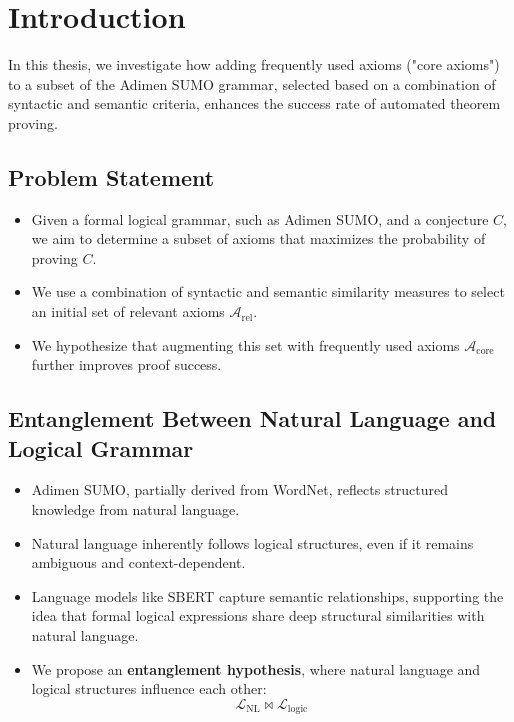 \documentclass[english,version-2020-11]{uzl-thesis}
\begin{document}
%
%


\chapter{Introduction}

  In this thesis, we investigate how adding frequently used axioms ("core axioms") to a subset of the Adimen SUMO grammar, selected based on a combination of syntactic and semantic criteria, enhances the success rate of automated theorem proving.

  \section{Problem Statement}
    \begin{itemize}
        \item Given a formal logical grammar, such as Adimen SUMO, and a conjecture $C$, we aim to determine a subset of axioms that maximizes the probability of proving $C$.
        \item We use a combination of syntactic and semantic similarity measures to select an initial set of relevant axioms $\mathcal{A}_{\text{rel}}$.
        \item We hypothesize that augmenting this set with frequently used axioms $\mathcal{A}_{\text{core}}$ further improves proof success.
    \end{itemize}
  \section{Entanglement Between Natural Language and Logical Grammar}
    \begin{itemize}
      \item Adimen SUMO, partially derived from WordNet, reflects structured knowledge from natural language.
      \item Natural language inherently follows logical structures, even if it remains ambiguous and context-dependent.
      \item Language models like SBERT capture semantic relationships, supporting the idea that formal logical expressions share deep structural similarities with natural language.
      \item We propose an \textbf{entanglement hypothesis}, where natural language and logical structures influence each other:
      \begin{equation}
          \mathcal{L}_{\text{NL}} \bowtie \mathcal{L}_{\text{logic}}
      \end{equation}
    \end{itemize}
\end{document}
